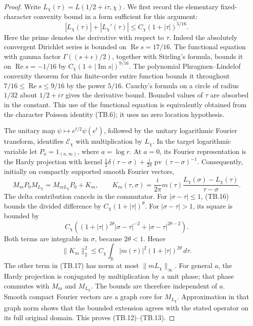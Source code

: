 \begin{proof}
Write \(L_\chi(\tau)=L(1/2+i\tau,\chi)\).
We first record the elementary fixed-character convexity
bound in a form sufficient for this argument:
\[
 |L_\chi(\tau)|+|L_\chi'(\tau)|
                      \leq C_\chi(1+|\tau|)^{5/16}.
 \tag{TB.16}
\]
Here the prime denotes the derivative with respect to \(\tau\).
Indeed the absolutely convergent Dirichlet series is bounded
on \(\operatorname{Re}s=17/16\).  The functional equation
with gamma factor \(\Gamma((s+\epsilon)/2)\), together with
Stirling's formula, bounds it on
\(\operatorname{Re}s=-1/16\) by
\(C_\chi(1+|\operatorname{Im}s|)^{9/16}\).
The polynomial Phragmen--Lindelof convexity theorem for this
finite-order entire function bounds it throughout
\(7/16\leq\operatorname{Re}s\leq9/16\) by the power
\(5/16\).  Cauchy's formula on a circle of radius \(1/32\)
about \(1/2+i\tau\) gives the derivative bound.  Bounded
values of \(\tau\) are absorbed in the constant.  This use
of the functional equation is equivalently obtained from
the character Poisson identity (TB.6); it uses no zero
location hypothesis.

The unitary map \(\psi\mapsto e^{t/2}\psi(e^t)\), followed
by the unitary logarithmic Fourier transform, identifies
\(\mathcal E_\chi\) with multiplication by \(L_\chi\).
In the target logarithmic variable let
\(P_a=1_{(a,\infty)}\), where \(a=\log r\).
At \(a=0\), its Fourier representation is the Hardy
projection with kernel
\(\tfrac12\delta(\tau-\sigma)+
\tfrac{i}{2\pi}\operatorname{pv}(\tau-\sigma)^{-1}\).
Consequently, initially on compactly supported smooth Fourier
vectors,
\[
 M_mP_0M_{L_\chi}
       =M_{mL_\chi}P_0+K_m,
 \qquad
 K_m(\tau,\sigma)=\frac{i}{2\pi}m(\tau)
       \frac{L_\chi(\sigma)-L_\chi(\tau)}{\tau-\sigma}.
 \tag{TB.17}
\]
The delta contribution cancels in the commutator.
For \(|\sigma-\tau|\leq1\), (TB.16) bounds the divided
difference by \(C_\chi(1+|\tau|)^\theta\).
For \(|\sigma-\tau|>1\), its square is bounded by
\[
 C_\chi\left((1+|\tau|)^{2\theta}
                  |\sigma-\tau|^{-2}
             +|\sigma-\tau|^{2\theta-2}\right).
\]
Both terms are integrable in \(\sigma\), because
\(2\theta<1\).  Hence
\[
 \|K_m\|_2^2
       \leq C_\chi\int_{\mathbb R}
                    |m(\tau)|^2(1+|\tau|)^{2\theta}\,d\tau.
\]
The other term in (TB.17) has norm at most
\(\|mL_\chi\|_\infty\).  For general \(a\), the Hardy
projection is conjugated by multiplication by a unit phase;
that phase commutes with \(M_m\) and \(M_{L_\chi}\).
The bounds are therefore independent of \(a\).
Smooth compact Fourier vectors are a graph core for
\(M_{L_\chi}\).  Approximation in that graph norm shows that
the bounded extension agrees with the stated operator on
its full original domain.  This proves (TB.12)--(TB.13).


\end{proof}
